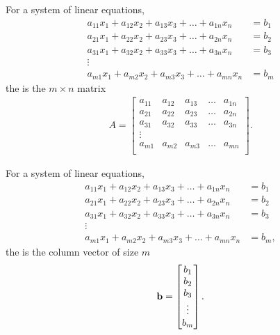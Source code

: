 \documentclass{ximera}
\begin{document}
\begin{definition}
For a system of linear equations,
\begin{align*}
a_{11}x_1+a_{12}x_2+a_{13}x_3+\dots+a_{1n}x_n&=b_1\\
a_{21}x_1+a_{22}x_2+a_{23}x_3+\dots+a_{2n}x_n&=b_2\\
a_{31}x_1+a_{32}x_2+a_{33}x_3+\dots+a_{3n}x_n&=b_3\\
\vdots&\\
a_{m1}x_1+a_{m2}x_2+a_{m3}x_3+\dots+a_{mn}x_n&=b_m
\end{align*}
the  is the $m\times n$ matrix
\begin{align*}
A=
\begin{bmatrix}
a_{11}&a_{12}&a_{13}&\dots&a_{1n}\\
a_{21}&a_{22}&a_{23}&\dots&a_{2n}\\
a_{31}&a_{32}&a_{33}&\dots&a_{3n}\\
\vdots&\\
a_{m1}&a_{m2}&a_{m3}&\dots&a_{mn}\\
\end{bmatrix}.
\end{align*}
\end{definition}

\begin{definition}
For a system of linear equations,
\begin{align*}
a_{11}x_1+a_{12}x_2+a_{13}x_3+\dots+a_{1n}x_n&=b_1\\
a_{21}x_1+a_{22}x_2+a_{23}x_3+\dots+a_{2n}x_n&=b_2\\
a_{31}x_1+a_{32}x_2+a_{33}x_3+\dots+a_{3n}x_n&=b_3\\
\vdots&\\
a_{m1}x_1+a_{m2}x_2+a_{m3}x_3+\dots+a_{mn}x_n&=b_m,
\end{align*}
the  is the column vector of size $m$
\[
\mathbf{b}=
\begin{bmatrix}
b_1\\
b_2\\
b_3\\
\vdots\\
b_m\\
\end{bmatrix}.
\]
\end{definition}
\end{document}
